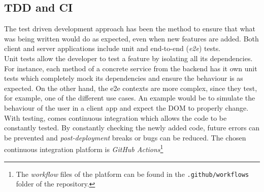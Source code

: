 \documentclass[a4paper, 12pt, oneside]{book}
\begin{document}
\subsection{TDD and CI}
The test driven development approach has been the method to ensure that what was being written would do as expected, even when new features are added. Both client and server applications include unit and end-to-end (\emph{e2e}) tests.
\\[8pt]
Unit tests allow the developer to test a feature by isolating all its dependencies. For instance, each method of a concrete service from the backend has it own unit tests which completely mock its dependencies and ensure the behaviour is as expected. On the other hand, the e2e contexts are more complex, since they test, for example, one of the different use cases. An example would be to simulate the behaviour of the user in a client app and expect the DOM to properly change.
\\[8pt]
With testing, comes continuous integration which allows the code to be constantly tested. By constantly checking the newly added code, future errors can be prevented and \emph{post-deployment} breaks or bugs can be reduced. The chosen continuous integration platform is \emph{GitHub Actions}\footnote{The \emph{workflow} files of the platform can be found in the \texttt{.github/workflows} folder of the repository.}
\end{document}
